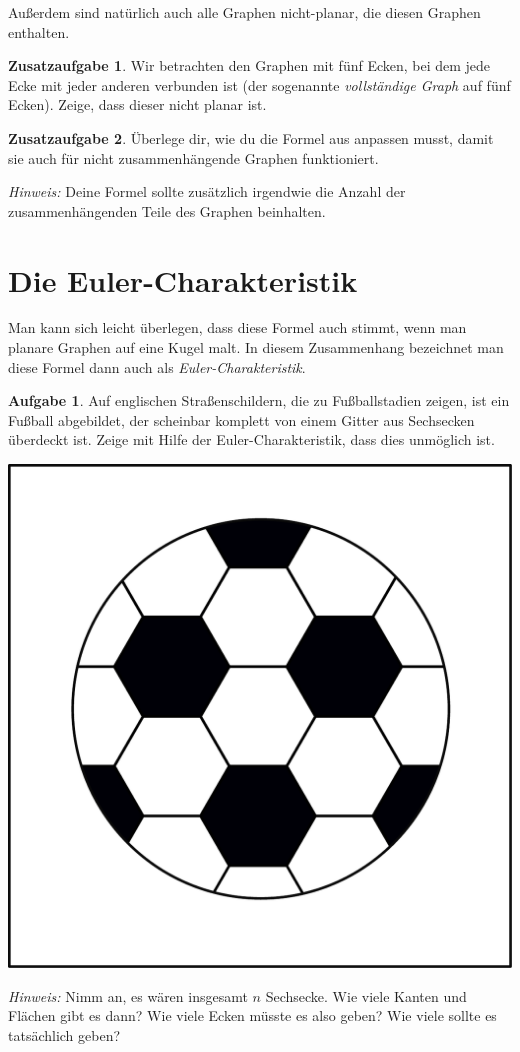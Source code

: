 \documentclass[a4paper,ngerman,12pt]{scrartcl}
\theoremstyle{definition}
\newtheorem{aufg}{Aufgabe}
\newtheorem{zaufg}{Zusatzaufgabe}
\theoremstyle{plain}
\theoremstyle{remark}
\begin{document}
Außerdem sind natürlich auch alle Graphen nicht-planar, die diesen Graphen enthalten.

\begin{zaufg}
	Wir betrachten den Graphen mit fünf Ecken, bei dem jede Ecke mit jeder anderen verbunden ist (der sogenannte \emph{vollständige Graph} auf fünf Ecken). Zeige, dass dieser nicht planar ist.
\end{zaufg}

\begin{zaufg}
	Überlege dir, wie du die Formel aus  anpassen musst, damit sie auch für nicht zusammenhängende Graphen funktioniert.
	
	\textit{Hinweis:} Deine Formel sollte zusätzlich irgendwie die Anzahl der zusammenhängenden Teile des Graphen beinhalten.
\end{zaufg}

\section{Die Euler-Charakteristik}

Man kann sich leicht überlegen, dass diese Formel auch stimmt, wenn man planare Graphen auf eine Kugel malt. In diesem Zusammenhang bezeichnet man diese Formel dann auch als \emph{Euler-Charakteristik}.

\begin{aufg}
	Auf englischen Straßenschildern, die zu Fußballstadien zeigen, ist ein Fußball abgebildet, der scheinbar komplett von einem Gitter aus Sechsecken überdeckt ist. Zeige mit Hilfe der Euler-Charakteristik, dass dies unmöglich ist.
	
	\begin{center}
		\includegraphics[width=.4\textwidth]{Bilder/FalscherFussball.pdf}
	\end{center}
	
	\textit{Hinweis:} Nimm an, es wären insgesamt $n$ Sechsecke. Wie viele Kanten und Flächen gibt es dann? Wie viele Ecken müsste es also geben? Wie viele sollte es tatsächlich geben?
\end{aufg}
\end{document}
